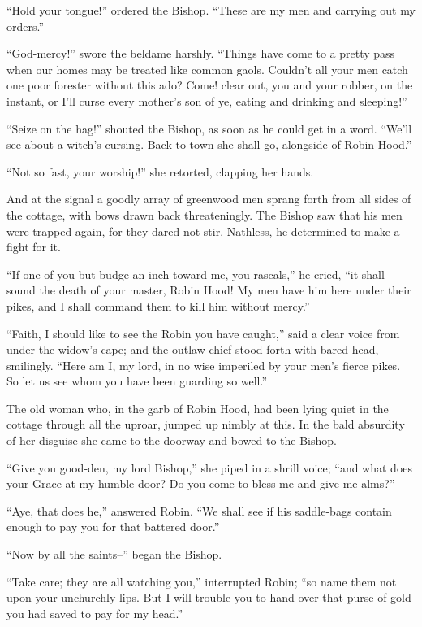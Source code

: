 ``Hold your tongue!'' ordered the Bishop. ``These are my men and
carrying out my orders.''

``God-mercy!'' swore the beldame harshly. ``Things have come to a pretty
pass when our homes may be treated like common gaols. Couldn't all your
men catch one poor forester without this ado? Come! clear out, you and
your robber, on the instant, or I'll curse every mother's son of ye,
eating and drinking and sleeping!''

``Seize on the hag!'' shouted the Bishop, as soon as he could get in a
word. ``We'll see about a witch's cursing. Back to town she shall go,
alongside of Robin Hood.''

``Not so fast, your worship!'' she retorted, clapping her hands.

And at the signal a goodly array of greenwood men sprang forth from all
sides of the cottage, with bows drawn back threateningly. The Bishop saw
that his men were trapped again, for they dared not stir. Nathless, he
determined to make a fight for it.

``If one of you but budge an inch toward me, you rascals,'' he cried,
``it shall sound the death of your master, Robin Hood! My men have him
here under their pikes, and I shall command them to kill him without
mercy.''

``Faith, I should like to see the Robin you have caught,'' said a clear
voice from under the widow's cape; and the outlaw chief stood forth with
bared head, smilingly. ``Here am I, my lord, in no wise imperiled by
your men's fierce pikes. So let us see whom you have been guarding so
well.''

The old woman who, in the garb of Robin Hood, had been lying quiet in
the cottage through all the uproar, jumped up nimbly at this. In the
bald absurdity of her disguise she came to the doorway and bowed to the
Bishop.

``Give you good-den, my lord Bishop,'' she piped in a shrill voice;
``and what does your Grace at my humble door? Do you come to bless me
and give me alms?''

``Aye, that does he,'' answered Robin. ``We shall see if his saddle-bags
contain enough to pay you for that battered door.''

``Now by all the saints--'' began the Bishop.

``Take care; they are all watching you,'' interrupted Robin; ``so name
them not upon your unchurchly lips. But I will trouble you to hand over
that purse of gold you had saved to pay for my head.''

